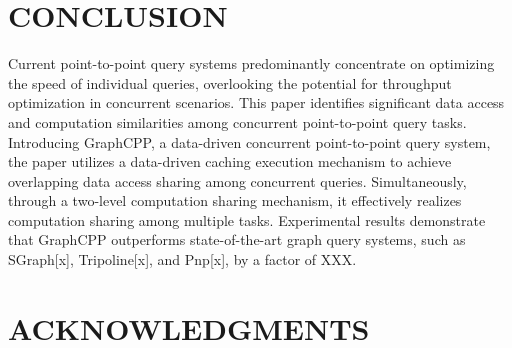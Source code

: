 \documentclass[lettersize,journal]{IEEEtran} %
\begin{document}
\section{CONCLUSION}
Current point-to-point query systems predominantly concentrate on optimizing the speed of individual queries, overlooking the potential for throughput optimization in concurrent scenarios. This paper identifies significant data access and computation similarities among concurrent point-to-point query tasks. Introducing GraphCPP, a data-driven concurrent point-to-point query system, the paper utilizes a data-driven caching execution mechanism to achieve overlapping data access sharing among concurrent queries. Simultaneously, through a two-level computation sharing mechanism, it effectively realizes computation sharing among multiple tasks. Experimental results demonstrate that GraphCPP outperforms state-of-the-art graph query systems, such as SGraph[x], Tripoline[x], and Pnp[x], by a factor of XXX.

\section{ACKNOWLEDGMENTS}
\end{document}
